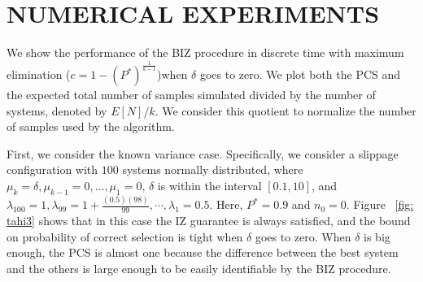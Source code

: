 \documentclass{wscpaperproc}
\theoremstyle{wsc}
\begin{document}
\section{NUMERICAL EXPERIMENTS}

We show the performance of the BIZ procedure in discrete time with maximum elimination
($c=1-(P^*)^\frac{1}{k-1}$)when $\delta$ goes to zero. We plot both the PCS and the expected total number 
of samples simulated divided by the number of systems, denoted by $E[N]/k$. We consider this quotient 
to normalize the number of samples used by the algorithm.

First, we consider the known variance case. Specifically, we consider a slippage configuration 
with $100$ systems normally distributed, where $\mu_{k}=\delta,\mu_{k-1}=0,\dots,\mu_{1}=0$, $\delta$ is 
within the interval $[0.1,10]$, and $\lambda_{100}=1,\lambda_{99}=1+\frac{(0.5)(98)}{99},\cdots,\lambda_{1}=0.5$. Here, $P^*=0.9$ and $n_{0}=0$.
Figure ~\ref{fig: tahi3} shows that in this case the IZ guarantee is always satisfied, and the bound on probability of correct selection is tight when $\delta$ goes to zero.
When $\delta$ is big enough, the PCS is almost one because the difference between the best system and the others is large enough to be easily identifiable by the
BIZ procedure.
\end{document}
